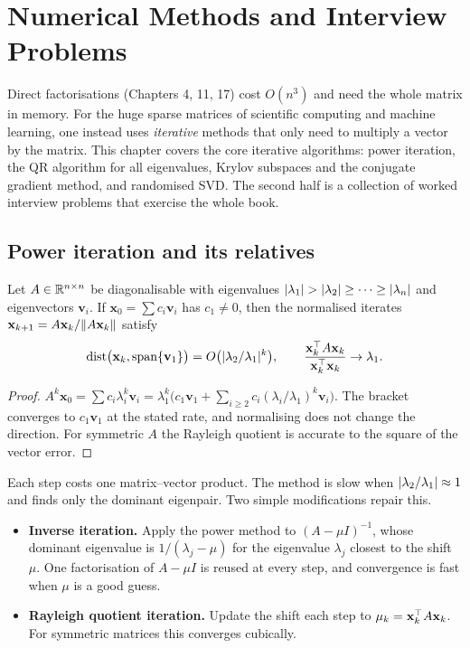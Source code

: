 \chapter{Numerical Methods and Interview Problems}

Direct factorisations (Chapters 4, 11, 17) cost $O(n^3)$ and need the whole matrix in memory. For the huge sparse matrices of scientific computing and machine learning, one instead uses \emph{iterative} methods that only need to multiply a vector by the matrix. This chapter covers the core iterative algorithms: power iteration, the QR algorithm for all eigenvalues, Krylov subspaces and the conjugate gradient method, and randomised SVD. The second half is a collection of worked interview problems that exercise the whole book.

\section{Power iteration and its relatives}

\begin{theorem}\label{thm:power}
Let $A\in\mathbb{R}^{n\times n}$ be diagonalisable with eigenvalues $\lvert\lambda_1\rvert>\lvert\lambda_2\rvert\ge\dots\ge\lvert\lambda_n\rvert$ and eigenvectors $\mathbf{v}_i$. If $\mathbf{x}_0=\sum c_i\mathbf{v}_i$ has $c_1\ne0$, then the normalised iterates $\mathbf{x}_{k+1}=A\mathbf{x}_k/\lVert A\mathbf{x}_k\rVert$ satisfy
\[ \mathrm{dist}\big(\mathbf{x}_k,\operatorname{span}\{\mathbf{v}_1\}\big)=O\big(\lvert\lambda_2/\lambda_1\rvert^k\big),\qquad\frac{\mathbf{x}_k^{\top} A\mathbf{x}_k}{\mathbf{x}_k^{\top}\mathbf{x}_k}\to\lambda_1. \]
\end{theorem}

\begin{proof}
$A^k\mathbf{x}_0=\sum c_i\lambda_i^k\mathbf{v}_i=\lambda_1^k\big(c_1\mathbf{v}_1+\sum_{i\ge2}c_i(\lambda_i/\lambda_1)^k\mathbf{v}_i\big)$. The bracket converges to $c_1\mathbf{v}_1$ at the stated rate, and normalising does not change the direction. For symmetric $A$ the Rayleigh quotient is accurate to the square of the vector error.
\end{proof}

Each step costs one matrix--vector product. The method is slow when $\lvert\lambda_2/\lambda_1\rvert\approx1$ and finds only the dominant eigenpair. Two simple modifications repair this.

\begin{itemize}
  \item \textbf{Inverse iteration.} Apply the power method to $(A-\mu I)^{-1}$, whose dominant eigenvalue is $1/(\lambda_j-\mu)$ for the eigenvalue $\lambda_j$ closest to the shift $\mu$. One factorisation of $A-\mu I$ is reused at every step, and convergence is fast when $\mu$ is a good guess.
  \item \textbf{Rayleigh quotient iteration.} Update the shift each step to $\mu_k=\mathbf{x}_k^{\top} A\mathbf{x}_k$. For symmetric matrices this converges cubically.
\end{itemize}

